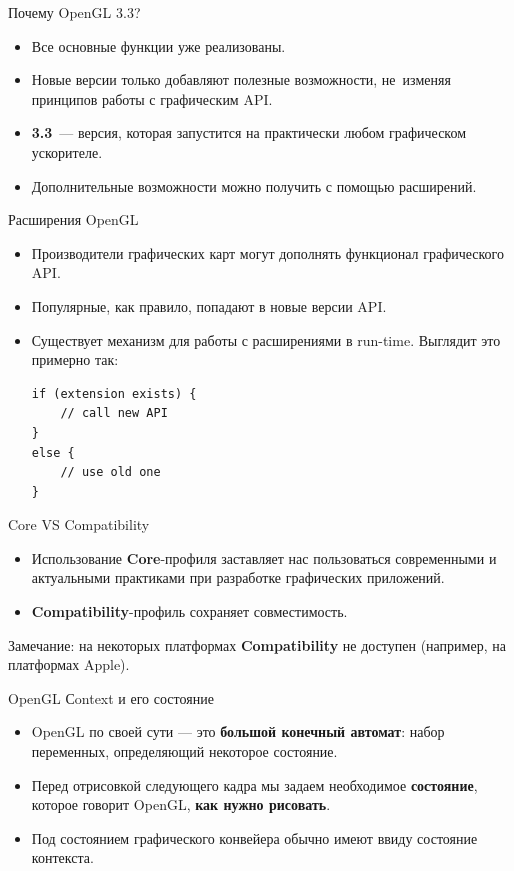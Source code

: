 \documentclass[aspectration=1610,t]{beamer}
\begin{document}
\begin{frame}[fragile]{Почему OpenGL 3.3?}
    \begin{itemize}
        \item Все основные функции уже реализованы.
        \item Новые версии только добавляют полезные возможности,
            не~изменяя принципов работы с графическим API.
        \item {\bf 3.3}~--- версия, которая запустится на практически 
            любом графическом ускорителе.
        \item Дополнительные возможности можно получить с помощью расширений.
    \end{itemize}
\end{frame}

\begin{frame}[fragile]{Расширения OpenGL}
    \begin{itemize}
        \item Производители графических карт могут дополнять функционал графического API.
        \item Популярные, как правило, попадают в новые версии API.
        \item Существует механизм для работы с расширениями в run-time.
            Выглядит это примерно так:
            {\small \begin{lstlisting}
if (extension exists) {
    // call new API
}
else {
    // use old one
}
            \end{lstlisting}}
    \end{itemize}
\end{frame}

\begin{frame}[fragile]{Core VS Compatibility}
    \begin{itemize}
        \item Использование {\bf Core}-профиля заставляет нас 
            пользоваться современными и актуальными практиками 
            при разработке графических приложений.
        \item {\bf Compatibility}-профиль сохраняет совместимость.
    \end{itemize}
    Замечание: на некоторых платформах {\bf Compatibility} 
    не доступен (например, на платформах Apple).
\end{frame}

\begin{frame}[fragile]{OpenGL Сontext и его состояние}
    \begin{itemize}
        \item OpenGL по своей сути — это {\bf большой конечный автомат}: набор переменных, 
            определяющий некоторое состояние.
        \item Перед отрисовкой следующего кадра мы задаем необходимое {\bf состояние}, 
            которое говорит OpenGL, {\bf как нужно рисовать}.
        \item Под состоянием графического конвейера обычно имеют ввиду состояние контекста.
    \end{itemize}
\end{frame}
\end{document}
